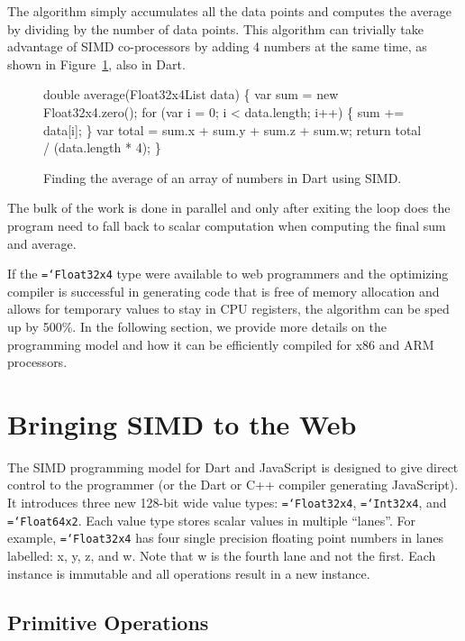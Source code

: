 \documentclass[preprint]{sigplanconf}
\newcommand{\ttt}[1]{{\texttt{\hyphenchar\font=`\-\relax #1}}}%
\begin{document}
The algorithm simply accumulates all the data points and computes the average by
dividing by the number of data points. This algorithm can trivially take
advantage of SIMD co-processors by adding 4 numbers at the same time, as
shown in Figure~\ref{fig:simd-average}, also in Dart.

\begin{figure}
\begin{small}
\begin{program}[style=tt, number=true]
do\tab{}uble average(Float32x4List data) \{
  var sum = new Float32x4.zero();
  fo\tab{}r (var i = 0; i < data.length; i++) \{
    sum += data[i];\untab{}
  \}
  var total = sum.x + sum.y + sum.z + sum.w;
  return total / (data.length * 4);\untab{}
\}
\end{program}
\end{small}
\caption{Finding the average of an array of numbers in Dart using SIMD.}
\label{fig:simd-average}
\end{figure}

The bulk of the work is done in parallel and only after exiting the loop
does the program need to fall back to scalar computation when computing the
final sum and average.

If the \ttt{Float32x4} type were available to web programmers and the optimizing
compiler is successful in generating code that is free of memory allocation and
allows for temporary values to stay in CPU registers, the algorithm can be sped
up by 500\%. In the following section, we provide more details on the
programming model and how it can be efficiently compiled for x86 and ARM
processors.

\section{Bringing SIMD to the Web}

The SIMD programming model for Dart and JavaScript is designed to give direct
control to the programmer (or the Dart or C++ compiler generating JavaScript).
It introduces three new 128-bit wide value types: \ttt{Float32x4},
\ttt{Int32x4}, and \ttt{Float64x2}. Each value type stores scalar values in
multiple ``lanes''. For example, \ttt{Float32x4} has four single precision
floating point numbers in lanes labelled: x, y, z, and w. Note that w is the
fourth lane and not the first. Each instance is immutable and all operations
result in a new instance.

\subsection{Primitive Operations}
\end{document}
